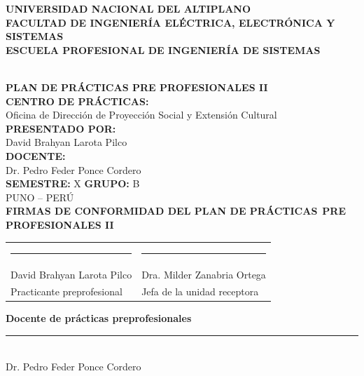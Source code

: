 \documentclass[12pt,a4paper]{article}
\begin{document}
\begin{titlepage}
\centering
\thispagestyle{empty}

{\Large\textbf{UNIVERSIDAD NACIONAL DEL ALTIPLANO}}\\[0.35cm]
{\large\textbf{FACULTAD DE INGENIERÍA ELÉCTRICA, ELECTRÓNICA Y SISTEMAS}}\\[0.35cm]
{\large\textbf{ESCUELA PROFESIONAL DE INGENIERÍA DE SISTEMAS}}\\[1.4cm]

\\[1.2cm]

{\Large\textbf{PLAN DE PRÁCTICAS PRE PROFESIONALES II}}\\[1.5cm]
{\large\textbf{CENTRO DE PRÁCTICAS:}}\\[0.2cm]
{\large Oficina de Dirección de Proyección Social y Extensión Cultural}\\[0.9cm]
{\large\textbf{PRESENTADO POR:}}\\[0.2cm]
{\large David Brahyan Larota Pilco}\\[0.9cm]
{\large\textbf{DOCENTE:}}\\[0.2cm]
{\large Dr. Pedro Feder Ponce Cordero}\\[0.9cm]
{\large\textbf{SEMESTRE:} X \hspace{1.5cm} \textbf{GRUPO:} B}\\[1.2cm]

{\large PUNO -- PERÚ}\\[1.5cm]

\textbf{FIRMAS DE CONFORMIDAD DEL PLAN DE PRÁCTICAS}\
\textbf{PRE PROFESIONALES II}\\[1cm]

\begin{tabular}{>{\centering\arraybackslash}p{}>{\centering\arraybackslash}p{}}
\rule{5cm}{0.4pt} & \rule{5cm}{0.4pt}\\
David Brahyan Larota Pilco & Dra. Milder Zanabria Ortega\\
Practicante preprofesional & Jefa de la unidad receptora
\end{tabular}

\vfill
\textbf{Docente de prácticas preprofesionales}\\[0.7cm]
\rule{6cm}{0.4pt}\\
Dr. Pedro Feder Ponce Cordero
\end{titlepage}
\end{document}
